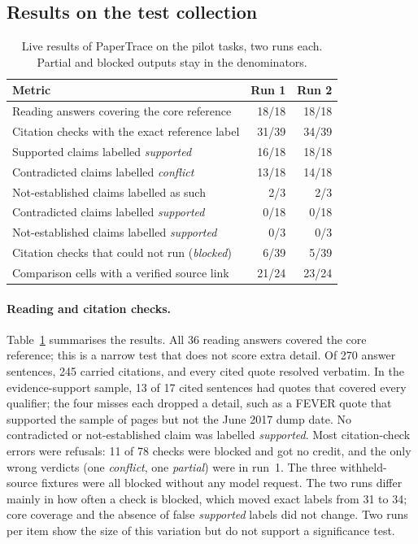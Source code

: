 \documentclass{article}
\begin{document}
\subsection{Results on the test collection}
\label{sec:eval-results}

\begin{table}[!hbp]
  \caption{Live results of PaperTrace on the pilot tasks, two runs each. Partial and blocked outputs
  stay in the denominators.}
  \label{tab:results}
  \small
  \centering
  \begin{tabular}{@{}lrr@{}}
    \toprule
    Metric & Run 1 & Run 2 \\
    \midrule
    Reading answers covering the core reference & 18/18 & 18/18 \\
    Citation checks with the exact reference label & 31/39 & 34/39 \\
    \quad Supported claims labelled \emph{supported} & 16/18 & 18/18 \\
    \quad Contradicted claims labelled \emph{conflict} & 13/18 & 14/18 \\
    \quad Not-established claims labelled as such & 2/3 & 2/3 \\
    Contradicted claims labelled \emph{supported} & 0/18 & 0/18 \\
    Not-established claims labelled \emph{supported} & 0/3 & 0/3 \\
    Citation checks that could not run (\emph{blocked}) & 6/39 & 5/39 \\
    \midrule
    Comparison cells with a verified source link & 21/24 & 23/24 \\
    \bottomrule
  \end{tabular}
\end{table}

\paragraph{Reading and citation checks.} Table~\ref{tab:results} summarises the results. All 36
reading answers covered the core reference; this is a narrow test that does not score extra detail.
Of 270 answer sentences, 245 carried citations, and every cited quote resolved verbatim. In the
evidence-support sample, 13 of 17 cited sentences had quotes that covered every qualifier; the four
misses each dropped a detail, such as a FEVER quote that supported the sample of pages but not the
June 2017 dump date. No contradicted or not-established claim was labelled \emph{supported}. Most
citation-check errors were refusals: 11 of 78 checks were blocked and got no credit, and the only
wrong verdicts (one \emph{conflict}, one \emph{partial}) were in run~1. The three withheld-source
fixtures were all blocked without any model request. The two runs differ mainly in how often a check
is blocked, which moved exact labels from 31 to 34; core coverage and the absence of false
\emph{supported} labels did not change. Two runs per item show the size of this variation but do not
support a significance test.
\end{document}

